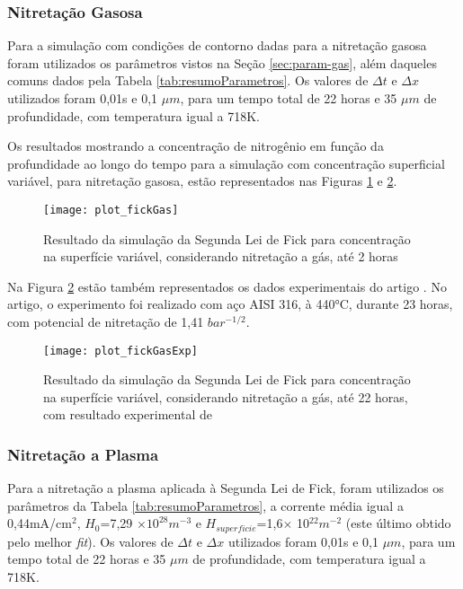 \subsubsection{Nitretação Gasosa}
Para a simulação com condições de contorno dadas para a nitretação gasosa foram utilizados os parâmetros vistos na Seção \ref{sec:param-gas}, além daqueles comuns dados pela Tabela \ref{tab:resumoParametros}. Os valores de $\Delta t$ e $\Delta x$ utilizados foram 0,01s e 0,1 $\mu m$, para um tempo total de 22 horas e 35 $\mu m$ de profundidade, com temperatura igual a 718K.

Os resultados mostrando a concentração de nitrogênio em função da profundidade ao longo do tempo para a simulação com concentração superficial variável, para nitretação gasosa, estão representados nas Figuras \ref{fig:csvar-gas1} e \ref{fig:csvar-gas2}.

\begin{figure}[!htb]
\centering
	\caption{Resultado da simulação da Segunda Lei de Fick para concentração na superfície variável, considerando nitretação a gás, até 2 horas}
	\texttt{[image: plot\_fickGas]}
	\label{fig:csvar-gas1}
	\centering
\end{figure}

Na Figura \ref{fig:csvar-gas2} estão também representados os dados experimentais do artigo \cite{christiansen2008nitrogen}. No artigo, o experimento foi realizado com aço AISI 316,  à 440°C, durante 23 horas, com potencial de nitretação de 1,41 $bar^{-1/2}$. 

\begin{figure}[!htb]
\centering
	\caption{Resultado da simulação da Segunda Lei de Fick para concentração na superfície variável, considerando nitretação a gás, até 22 horas, com resultado experimental de \cite{christiansen2008nitrogen}}
	\texttt{[image: plot\_fickGasExp]}
	\label{fig:csvar-gas2}
	\centering
\end{figure}


\FloatBarrier


\subsubsection{Nitretação a Plasma}
Para a nitretação a plasma aplicada à Segunda Lei de Fick, foram utilizados os parâmetros 
da Tabela \ref{tab:resumoParametros}, a corrente média igual a 0,44mA/cm$^2$, $H_0$=7,29 $\times 10^{28} m^{-3}$ e $H_{superficie}$=1,6$\times$ 10$^{22} m^{-2}$ (este último obtido pelo melhor \textit{fit}). Os valores de $\Delta t$ e $\Delta x$ utilizados foram 0,01s e 0,1 $\mu m$, para um tempo total de 22 horas e 35 $\mu m$ de profundidade, com temperatura igual a 718K.

